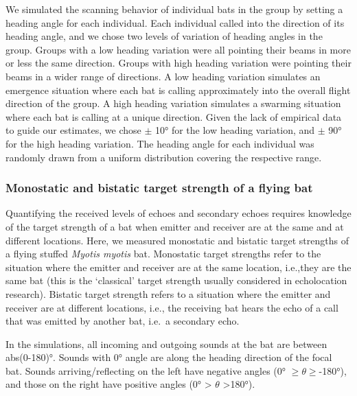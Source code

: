 \documentclass[
]{book}
\begin{document}
We simulated the scanning behavior of individual bats in the group by setting a
heading angle for each individual. Each individual called into the direction of its heading angle, and we chose two levels of variation of heading angles in the group. Groups with a low heading variation were all pointing their beams in more or less the same direction. Groups with high heading variation were pointing their beams in a wider range of directions. A low heading variation simulates an emergence situation where each bat is calling approximately into the overall flight direction of the group. A high heading variation simulates a swarming situation where each bat is calling at a unique direction. Given the lack of empirical data to guide our estimates, we chose \(\pm\) 10° for the low heading variation, and \(\pm\) 90° for the high heading variation. The heading angle for each individual was randomly drawn from a uniform distribution covering the respective range.

\hypertarget{monostatic-and-bistatic-target-strength-of-a-flying-bat}{%
\subsubsection{\texorpdfstring{Monostatic and bistatic target strength of a flying bat \label{cpn_targetstrength}}{Monostatic and bistatic target strength of a flying bat }}\label{monostatic-and-bistatic-target-strength-of-a-flying-bat}}

Quantifying the received levels of echoes and secondary echoes requires
knowledge of the target strength of a bat when emitter and receiver are at the same and at different locations. Here, we measured monostatic and bistatic target strengths \citep{richards2010a} of a flying stuffed \emph{Myotis myotis} bat. Monostatic target strengths refer to the situation where the emitter and receiver are at the same location, i.e.,they are the same bat (this is the `classical' target strength usually considered in echolocation research). Bistatic target strength refers to a situation where the emitter and receiver are at different locations, i.e., the receiving bat hears the echo of a call that was emitted by another bat, i.e.~a secondary echo.

In the simulations, all incoming and outgoing sounds at the bat are between abs(0-180)°. Sounds with 0° angle are along the heading direction of the focal bat. Sounds arriving/reflecting on the left have negative angles (0° \(\geq \theta \geq\)-180°), and those on the right have positive angles (0° \textgreater{} \(\theta\) \textgreater180°).
\end{document}
